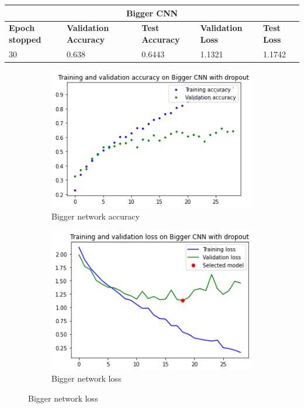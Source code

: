 \begin{tabular}{ |p{2cm}|p{2cm}|p{2cm}|p{2cm}|p{2cm}|  }
\hline
\multicolumn{5}{|c|}{Bigger CNN} \\
\hline
\textbf{Epoch stopped} & \textbf{Validation Accuracy} & \textbf{Test Accuracy} & \textbf{Validation Loss} & \textbf{Test Loss} \\
\hline
30 & 0.638 & 0.6443 & 1.1321 & 1.1742\\
\hline
\end{tabular}

\medskip


\begin{figure}[H]
	\begin{subfigure}{0.5\textwidth}
		\includegraphics[width=0.9\linewidth]{img/scratch/bigger_acc.png} 
		\caption{Bigger network accuracy}
		\label{fig:BiggerCNNacc}
	\end{subfigure}
	\begin{subfigure}{0.5\textwidth}
		\includegraphics[width=0.9\linewidth]{img/scratch/bigger_loss.png}
		\caption{Bigger network loss}
		\label{fig:BiggerCNNloss}
	\end{subfigure}
\end{figure}

